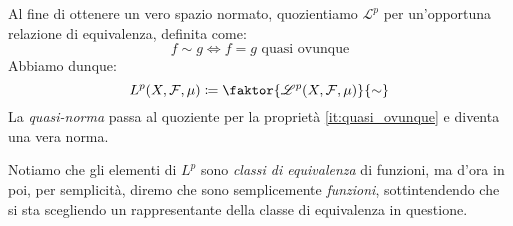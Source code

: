 Al fine di ottenere un vero spazio normato, quozientiamo $ \mathscr{L}^p $ per un'opportuna relazione di equivalenza, definita come:
\[ f \sim g \iff f = g \text{ quasi ovunque} \]
Abbiamo dunque:
\[ L^p(X,\mathcal{F},\mu) \coloneqq \faktor{\mathscr{L}^p(X,\mathcal{F},\mu)}{\sim} \]
La \emph{quasi-norma} passa al quoziente per la proprietà \eqref{it:quasi_ovunque} e diventa una vera norma.

Notiamo che gli elementi di $ L^p $ sono \emph{classi di equivalenza} di funzioni, ma d'ora in poi, per semplicità, diremo che sono semplicemente \emph{funzioni}, sottintendendo che si sta scegliendo un rappresentante della classe di equivalenza in questione.
